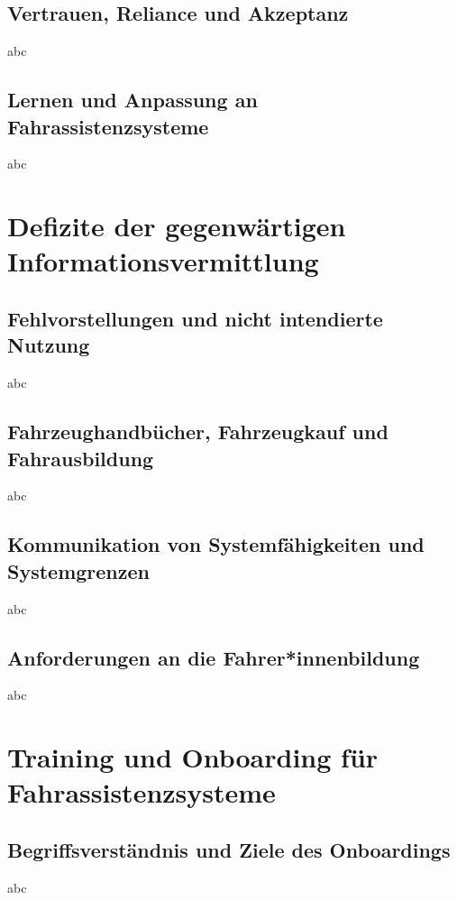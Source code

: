 \subsection{Vertrauen, Reliance und Akzeptanz}
\label{subsec:vertrauen_akzeptanz}
abc

\subsection{Lernen und Anpassung an Fahrassistenzsysteme}
\label{subsec:lernen_anpassung}
abc


\section{Defizite der gegenwärtigen Informationsvermittlung}
\label{sec:informationsdefizite}

\subsection{Fehlvorstellungen und nicht intendierte Nutzung}
\label{subsec:fehlvorstellungen_fehlgebrauch}
abc

\subsection{Fahrzeughandbücher, Fahrzeugkauf und Fahrausbildung}
\label{subsec:informationsquellen}
abc

\subsection{Kommunikation von Systemfähigkeiten und Systemgrenzen}
\label{subsec:kommunikation_systemgrenzen}
abc

\subsection{Anforderungen an die Fahrer*innenbildung}
\label{subsec:anforderungen_fahrerbildung}
abc


\section{Training und Onboarding für Fahrassistenzsysteme}
\label{sec:training_onboarding}

\subsection{Begriffsverständnis und Ziele des Onboardings}
\label{subsec:onboarding_begriff}
abc

